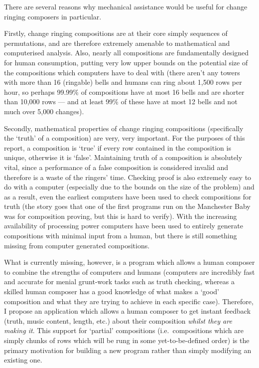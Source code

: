 \documentclass[12pt]{article}
\begin{document}
There are several reasons why mechanical assistance would be useful for change ringing composers in
particular.

Firstly, change ringing compositions are at their core simply sequences of permutations, and are
therefore extremely amenable to mathematical and computerised analysis.  Also, nearly all
compositions are fundamentally designed for human consumption, putting very low upper bounds on the
potential size of the compositions which computers have to deal with (there aren't any towers with
more than 16 (ringable) bells and humans can ring about 1,500 rows per hour, so perhaps 99.99\% of
compositions have at most 16 bells and are shorter than 10,000 rows --- and at least 99\% of these
have at most 12 bells and not much over 5,000 changes).

Secondly, mathematical properties of change ringing compositions (specifically the `truth' of a
composition) are very, very important.  For the purposes of this report, a composition is `true' if
every row contained in the composition is unique, otherwise it is `false'.  Maintaining truth of a
composition is absolutely vital, since a performance of a false composition is considered invalid
and therefore is a waste of the ringers' time.  Checking proof is also extremely easy to do with a
computer (especially due to the bounds on the size of the problem) and as a result, even the
earliest computers have been used to check compositions for truth (the story goes that one of the
first programs run on the Manchester Baby was for composition proving, but this is hard to verify).
With the increasing availability of processing power computers have been used to entirely generate
compositions with minimal input from a human, but there is still something missing from computer
generated compositions.

What is currently missing, however, is a program which allows a human composer to combine the
strengths of computers and humans (computers are incredibly fast and accurate for menial grunt-work
tasks such as truth checking, whereas a skilled human composer has a good knowledge of what makes a
`good' composition and what they are trying to achieve in each specific case).  Therefore, I propose
an application which allows a human composer to get instant feedback (truth, music content, length,
etc.) about their composition \emph{whilst they are making it}.  This support for `partial'
compositions (i.e.\ compositions which are simply chunks of rows which will be rung in some
yet-to-be-defined order) is the primary motivation for building a new program rather than simply
modifying an existing one.
\end{document}

